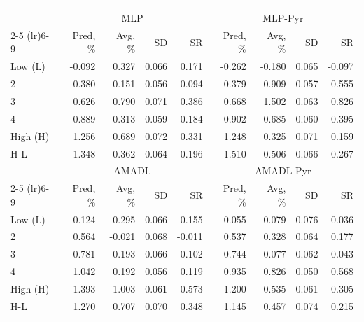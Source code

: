 \begin{tabular}{lrrrrrrrr}
\hline \hline \\ [-1.8ex]
 & \multicolumn{4}{c}{MLP} & \multicolumn{4}{c}{MLP-Pyr} \\
 \cmidrule(lr){2-5} \cmidrule(lr){6-9}
  & Pred, \% & Avg, \% & SD & SR & Pred, \% & Avg, \% & SD & SR \\
\midrule
Low (L) & -0.092 & 0.327 & 0.066 & 0.171 & -0.262 & -0.180 & 0.065 & -0.097 \\
2 & 0.380 & 0.151 & 0.056 & 0.094 & 0.379 & 0.909 & 0.057 & 0.555 \\
3 & 0.626 & 0.790 & 0.071 & 0.386 & 0.668 & 1.502 & 0.063 & 0.826 \\
4 & 0.889 & -0.313 & 0.059 & -0.184 & 0.902 & -0.685 & 0.060 & -0.395 \\
High (H) & 1.256 & 0.689 & 0.072 & 0.331 & 1.248 & 0.325 & 0.071 & 0.159 \\
H-L & 1.348 & 0.362 & 0.064 & 0.196 & 1.510 & 0.506 & 0.066 & 0.267 \\
\midrule
 & \multicolumn{4}{c}{AMADL} & \multicolumn{4}{c}{AMADL-Pyr} \\
 \cmidrule(lr){2-5} \cmidrule(lr){6-9}
  & Pred, \% & Avg, \% & SD & SR & Pred, \% & Avg, \% & SD & SR \\
\midrule
Low (L) & 0.124 & 0.295 & 0.066 & 0.155 & 0.055 & 0.079 & 0.076 & 0.036 \\
2 & 0.564 & -0.021 & 0.068 & -0.011 & 0.537 & 0.328 & 0.064 & 0.177 \\
3 & 0.781 & 0.193 & 0.066 & 0.102 & 0.744 & -0.077 & 0.062 & -0.043 \\
4 & 1.042 & 0.192 & 0.056 & 0.119 & 0.935 & 0.826 & 0.050 & 0.568 \\
High (H) & 1.393 & 1.003 & 0.061 & 0.573 & 1.200 & 0.535 & 0.061 & 0.305 \\
H-L & 1.270 & 0.707 & 0.070 & 0.348 & 1.145 & 0.457 & 0.074 & 0.215 \\
\hline \hline
\end{tabular}